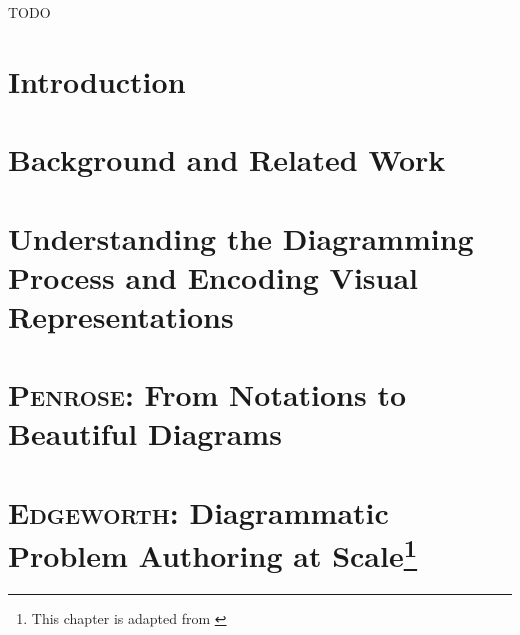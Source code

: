 \documentclass[12pt]{cmuthesis}
\newcommand*{\Penrose}{\textsc{Penrose}\xspace}
\newcommand*{\Edgeworth}{\textsc{Edgeworth}\xspace}
\begin{document}
\begin{acknowledgments}
TODO
\end{acknowledgments}


\tableofcontents
\listoffigures
\listoftables

\mainmatter


%
%
%
%
%


% 
\chapter{Introduction}
% 

\chapter{Background and Related Work}

\chapter{Understanding the Diagramming Process and Encoding Visual Representations}
\label{chp:interviews}
% 

\chapter{\Penrose: From Notations to Beautiful Diagrams}
\label{chp:penrose}


\chapter[\Edgeworth: Diagrammatic Problem Authoring at Scale]{\Edgeworth: Diagrammatic Problem Authoring at Scale\footnote{This chapter is adapted from \citet[Sections~1--5]{ni_edgeworth_2024}}}
\label{chp:edgeworth}

\end{document}
